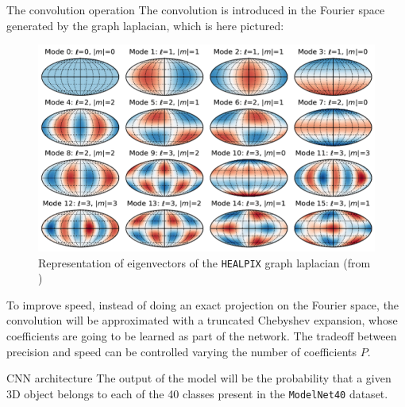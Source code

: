 \documentclass[final]{beamer}
\newlength{\colwidth}
\begin{document}
\begin{frame}[t]
\begin{columns}[t]
\begin{column}{\colwidth}
  \begin{block}{The convolution operation}
    The convolution is introduced in the Fourier space generated by the graph laplacian, which is here pictured:
    \begin{figure}[h]
      \includegraphics[width=0.7\colwidth]{healpix-fourier.png}
      \caption{Representation of eigenvectors of the \texttt{HEALPIX} graph laplacian (from \cite{deepshpere_cosmo})}
    \end{figure}
    
    To improve speed, instead of doing an exact projection on the Fourier space, the convolution will be approximated with a truncated Chebyshev expansion, whose coefficients are going to be learned as part of the network. The tradeoff between precision and speed can be controlled varying the number of coefficients $P$.
  \end{block}

  \begin{block}{CNN architecture}
    The output of the model will be the probability that a given 3D object belongs to each of the 40 classes present in the \texttt{ModelNet40} dataset.


\end{block}
\end{column}
\end{columns}
\end{frame}
\end{document}
